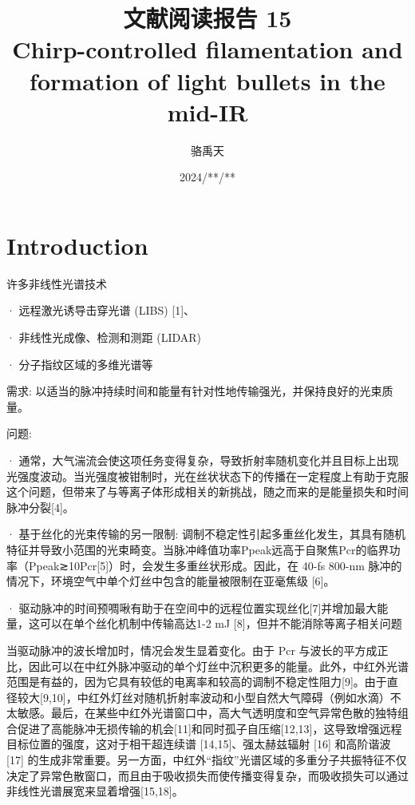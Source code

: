 \documentclass[14pt,a4paper,oneside]{article}
\title{\textbf{文献阅读报告 15\\Chirp-controlled filamentation and formation of light bullets in the mid-IR}\cite{shumakovaChirpcontrolledFilamentationFormation2019}}                           %
\author{骆禹天}                                           %
\date{2024/**/**}                                        %
\begin{document}

\maketitle

\setcounter{page}{1}          %


\tableofcontents              %

\newpage
\setcounter{page}{1}          %








\section{Introduction}

许多非线性光谱技术

· 远程激光诱导击穿光谱 (LIBS) [1]、

· 非线性光成像、检测和测距 (LIDAR)

· 分子指纹区域的多维光谱等

需求: 以适当的脉冲持续时间和能量有针对性地传输强光，并保持良好的光束质量。

问题: 

· 通常，大气湍流会使这项任务变得复杂，导致折射率随机变化并且目标上出现光强度波动。当光强度被钳制时，光在丝状状态下的传播在一定程度上有助于克服这个问题，但带来了与等离子体形成相关的新挑战，随之而来的是能量损失和时间脉冲分裂[4]。

· 基于丝化的光束传输的另一限制: 调制不稳定性引起多重丝化发生，其具有随机特征并导致小范围的光束畸变。当脉冲峰值功率Ppeak远高于自聚焦Pcr的临界功率（Ppeak≳10Pcr[5]）时，会发生多重丝状形成。因此，在 40-fs 800-nm 脉冲的情况下，环境空气中单个灯丝中包含的能量被限制在亚毫焦级 [6]。

· 驱动脉冲的时间预啁啾有助于在空间中的远程位置实现丝化[7]并增加最大能量，这可以在单个丝化机制中传输高达1-2 mJ [8]，但并不能消除等离子相关问题

当驱动脉冲的波长增加时，情况会发生显着变化。由于 Pcr 与波长的平方成正比，因此可以在中红外脉冲驱动的单个灯丝中沉积更多的能量。此外，中红外光谱范围是有益的，因为它具有较低的电离率和较高的调制不稳定性阻力[9]。由于直径较大[9,10]，中红外灯丝对随机折射率波动和小型自然大气障碍（例如水滴）不太敏感。最后，在某些中红外光谱窗口中，高大气透明度和空气异常色散的独特组合促进了高能脉冲无损传输的机会[11]和同时孤子自压缩[12,13]，这导致增强远程目标位置的强度，这对于相干超连续谱 [14,15]、强太赫兹辐射 [16] 和高阶谐波 [17] 的生成非常重要。另一方面，中红外“指纹”光谱区域的多重分子共振特征不仅决定了异常色散窗口，而且由于吸收损失而使传播变得复杂，而吸收损失可以通过非线性光谱展宽来显着增强[15,18]。
\end{document}
